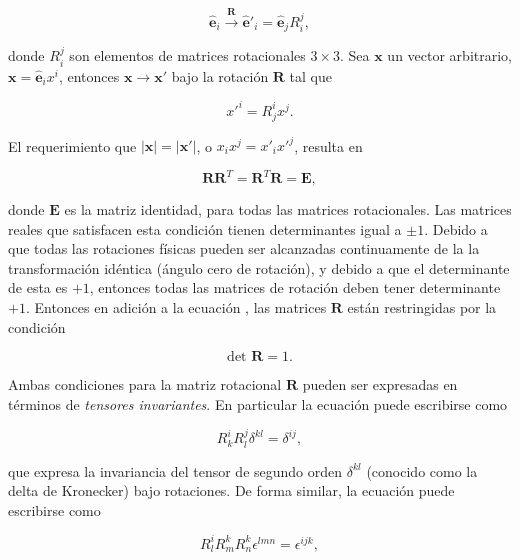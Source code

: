 \documentclass[a4paper,10pt]{article}
\numberwithin{equation}{section}
\begin{document}
\begin{equation}
 \hat{\mathbf{e}}_i \xrightarrow{\mathbf{R}} \hat{\mathbf{e}}'_i = \hat{\mathbf{e}}_j R^j_i,
\end{equation}

donde $R^j_i$ son elementos de matrices rotacionales $3\times 3$. Sea $\mathbf{x}$ un 
vector arbitrario, $\mathbf{x} = \hat{\mathbf{e}}_i x^i$, entonces 
$\mathbf{x} \rightarrow \mathbf{x}'$ bajo la rotación $\mathbf{R}$ tal que

\begin{equation}
 x'^{i} = R^i_j x^j. 
\end{equation}

El requerimiento que $|\mathbf{x}| = |\mathbf{x}'|$, o $x_i x^j = x'_i x'^{j}$, resulta en 

\begin{equation}
 \mathbf{R}\mathbf{R}^T = \mathbf{R}^T\mathbf{R} = \mathbf{E},
 \label{eq:identidadSO31}
\end{equation}

donde $\mathbf{E}$ es la matriz identidad, para todas las matrices rotacionales. Las 
matrices reales que satisfacen esta condición tienen determinantes igual a $\pm 1$. Debido 
a que todas las rotaciones físicas pueden ser alcanzadas continuamente de la 
la transformación idéntica (ángulo cero de rotación), y debido a que el determinante 
de esta es $+1$, entonces todas las matrices de rotación deben tener determinante $+1$. Entonces 
en adición a la ecuación , las matrices $\mathbf{R}$ están restringidas 
por la condición

\begin{equation}
 \text{det } \mathbf{R} = 1.
 \label{eq:unoSO31}
\end{equation}

Ambas condiciones para la matriz rotacional $\mathbf{R}$ pueden ser expresadas 
en términos de \emph{tensores invariantes}. En particular la ecuación  
puede escribirse como

\begin{equation}
 R^i_k R^j_l \delta^{kl} = \delta^{ij}, 
 \label{eq:identidadSO32}
\end{equation}

que expresa la invariancia del tensor de segundo orden $\delta^{kl}$ (conocido como
la delta de Kronecker) bajo rotaciones. De forma similar, la ecuación  
puede escribirse como

\begin{equation}
 R^i_l R^k_m R^k_n \epsilon^{lmn} = \epsilon^{ijk},
 \label{eq:unoSO32}
\end{equation}
\end{document}
